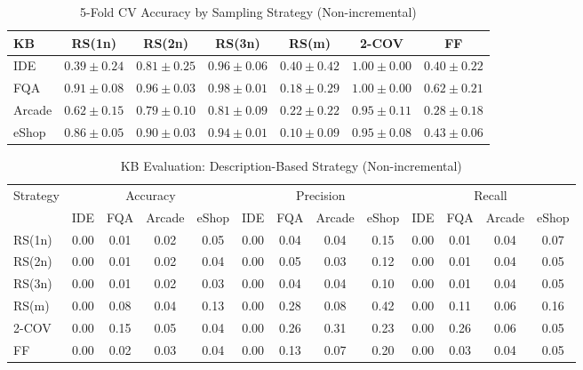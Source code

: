 
\begin{table}[htbp]
\centering
\caption{5-Fold CV Accuracy by Sampling Strategy (Non-incremental)}
\label{tab:accuracy_combined}
\begin{tabular}{lcccccc}
\toprule
KB & RS(1n) & RS(2n) & RS(3n) & RS(m) & 2-COV & FF \\
\midrule
IDE    & $0.39 \pm 0.24$ & $0.81 \pm 0.25$ & $0.96 \pm 0.06$ & $0.40 \pm 0.42$ & $1.00 \pm 0.00$ & $0.40 \pm 0.22$ \\
FQA    & $0.91 \pm 0.08$ & $0.96 \pm 0.03$ & $0.98 \pm 0.01$ & $0.18 \pm 0.29$ & $1.00 \pm 0.00$ & $0.62 \pm 0.21$ \\
Arcade & $0.62 \pm 0.15$ & $0.79 \pm 0.10$ & $0.81 \pm 0.09$ & $0.22 \pm 0.22$ & $0.95 \pm 0.11$ & $0.28 \pm 0.18$ \\
eShop  & $0.86 \pm 0.05$ & $0.90 \pm 0.03$ & $0.94 \pm 0.01$ & $0.10 \pm 0.09$ & $0.95 \pm 0.08$ & $0.43 \pm 0.06$ \\
\bottomrule
\end{tabular}
\end{table}


\begin{table}[htbp]
\centering
\caption{KB Evaluation: Description-Based Strategy (Non-incremental)}
\label{tab:kb_eval_desc}
\begin{tabular}{l|cccc|cccc|cccc}
\toprule
\multirow{2}{*}{Strategy}
    & \multicolumn{4}{c|}{Accuracy}
    & \multicolumn{4}{c|}{Precision}
    & \multicolumn{4}{c}{Recall} \\
    & IDE & FQA & Arcade & eShop
    & IDE & FQA & Arcade & eShop
    & IDE & FQA & Arcade & eShop \\
\midrule
RS(1n) & 0.00 & 0.01 & 0.02 & 0.05 & 0.00 & 0.04 & 0.04 & 0.15 & 0.00 & 0.01 & 0.04 & 0.07 \\
RS(2n) & 0.00 & 0.01 & 0.02 & 0.04 & 0.00 & 0.05 & 0.03 & 0.12 & 0.00 & 0.01 & 0.04 & 0.05 \\
RS(3n) & 0.00 & 0.01 & 0.02 & 0.03 & 0.00 & 0.04 & 0.04 & 0.10 & 0.00 & 0.01 & 0.04 & 0.05 \\
RS(m)  & 0.00 & 0.08 & 0.04 & 0.13 & 0.00 & 0.28 & 0.08 & 0.42 & 0.00 & 0.11 & 0.06 & 0.16 \\
2-COV  & 0.00 & 0.15 & 0.05 & 0.04 & 0.00 & 0.26 & 0.31 & 0.23 & 0.00 & 0.26 & 0.06 & 0.05 \\
FF     & 0.00 & 0.02 & 0.03 & 0.04 & 0.00 & 0.13 & 0.07 & 0.20 & 0.00 & 0.03 & 0.04 & 0.05 \\
\bottomrule
\end{tabular}
\end{table}

